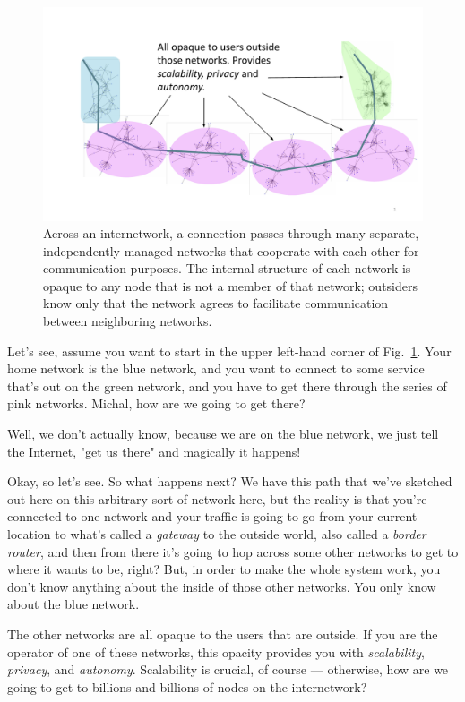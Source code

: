 \begin{figure}[t]
    \centering
    \includegraphics[width=1\textwidth]{lesson15/R2L15fig1.pdf}
    \caption[Network of Networks]{Across an internetwork, a connection passes through many separate, independently managed networks that cooperate with each other for communication purposes.  The internal structure of each network is opaque to any node that is not a member of that network; outsiders know only that the network agrees to facilitate communication between neighboring networks.}
    \label{fig:15-1-NofN}
\end{figure}


Let's see, assume you want to start in the upper left-hand corner of Fig.~\ref{fig:15-1-NofN}. Your home network is the blue network, and you want to connect to some service that's out on the green network, and you have to get there through the series of pink networks. Michal, how are we going to get there?

\mmm Well, we don't actually know, because we are on the blue network, we just tell the Internet, "get us there" and magically it happens!

\rrr Okay, so let's see. So what happens next? We have this path that we've sketched out here on this arbitrary sort of network here, but the reality is that you're connected to one network and your traffic is going to go from your current location to what's called a \emph{gateway} to the outside world, also called a \emph{border router}, and then from there it's going to hop across some other networks to get to where it wants to be, right? But, in order to make the whole system work, you don't know anything about the inside of those other networks. You only know about the blue network.

The other networks are all opaque to the users that are outside. If you are the operator of one of these networks, this opacity provides you with \emph{scalability}, \emph{privacy}, and \emph{autonomy}. Scalability is crucial, of course --- otherwise, how are we going to get to billions and billions of nodes on the internetwork?

